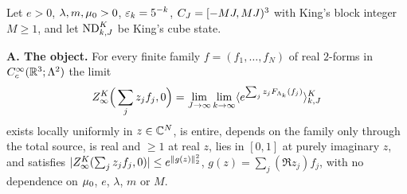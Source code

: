 \begin{theorem}\label{thm:s13:main}
Let $e>0$, $\lambda,m,\mu_0>0$, $\varepsilon_k=5^{-k}$, $C_J=[-MJ,MJ)^3$ with King's block integer $M\ge1$, and let $\mathrm{ND}^{K}_{k,J}$ be King's cube state.

\smallskip\noindent\textbf{A. The object.} For every finite family $f=(f_1,\dots,f_N)$ of real $2$-forms in $C^\infty_c(\mathbb R^3;\Lambda^2)$ the limit
\[
Z^{K}_{\infty}\Big(\sum_jz_jf_j,0\Big)=\lim_{J\to\infty}\lim_{k\to\infty}\langle e^{\sum_jz_jF_{\Lambda_k}(f_j)}\rangle^{K}_{k,J}
\]
exists locally uniformly in $z\in\mathbb C^N$, is entire, depends on the family only through the total source, is real and $\ge1$ at real $z$, lies in $[0,1]$ at purely imaginary $z$, and satisfies $|Z^{K}_{\infty}(\sum_jz_jf_j,0)|\le e^{\lVert g(z)\rVert_2^2}$, $g(z)=\sum_j(\Re z_j)f_j$, with no dependence on $\mu_0$, $e$, $\lambda$, $m$ or $M$.


\end{theorem}
